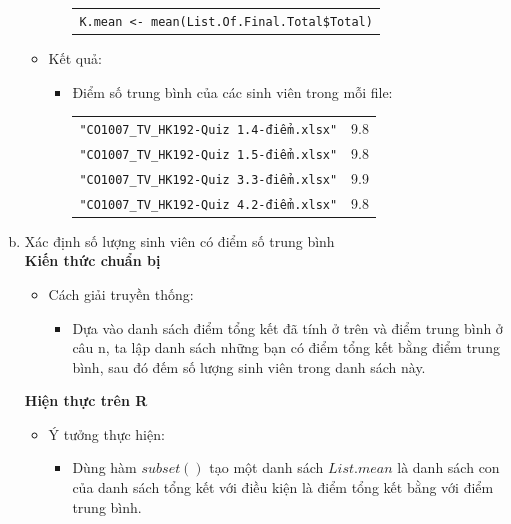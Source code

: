 \documentclass[a4paper]{article}
\theoremstyle{definition}
\begin{document}
\begin{enumerate}[a)]
\begin{itemize}
\begin{itemize}
\begin{center}
\begin{tabular}{p{13cm}}
                    \texttt{K.mean <- mean(List.Of.Final.Total\$Total)}
                \end{tabular}
            \end{center}
        \end{itemize}
        \item Kết quả:
        \begin{itemize}
            \item Điểm số trung bình của các sinh viên trong mỗi file:
            \begin{center}
                \begin{tabular}{l c}
                     \texttt{"CO1007\_TV\_HK192-Quiz 1.4-điểm.xlsx"} & 9.8\\
                     \texttt{"CO1007\_TV\_HK192-Quiz 1.5-điểm.xlsx"} & 9.8\\
                     \texttt{"CO1007\_TV\_HK192-Quiz 3.3-điểm.xlsx"} & 9.9\\
                     \texttt{"CO1007\_TV\_HK192-Quiz 4.2-điểm.xlsx"} & 9.8
                \end{tabular}
            \end{center}
        \end{itemize}
    \end{itemize}
    \bf\item Xác định số lượng sinh viên có điểm số trung bình \\[6pt]
    \bf Kiến thức chuẩn bị\normalfont
    \begin{itemize}
        \item Cách giải truyền thống:
        \begin{itemize}
            \item Dựa vào danh sách điểm tổng kết đã tính ở trên và điểm trung bình ở câu n, ta lập danh sách những bạn có điểm tổng kết bằng điểm trung bình, sau đó đếm số lượng sinh viên trong danh sách này.
        \end{itemize}
    \end{itemize}
    \bf Hiện thực trên R\normalfont
    \begin{itemize}
        \item Ý tưởng thực hiện:
        \begin{itemize}
            \item Dùng hàm $subset()$ tạo một danh sách $List.mean$ là danh sách con của danh sách tổng kết với điều kiện là điểm tổng kết bằng với điểm trung bình.
            \begin{center}

\end{center}
\end{itemize}
\end{itemize}
\end{enumerate}
\end{document}
